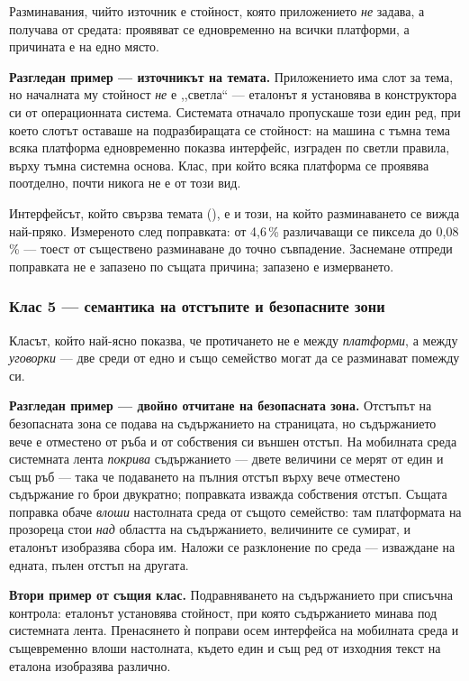 Разминавания, чийто източник е стойност, която приложението \emph{не} задава, а получава от
средата: проявяват се едновременно на всички платформи, а причината е на едно място.

\textbf{Разгледан пример --- източникът на темата.} Приложението има слот за тема, но началната му
стойност \emph{не} е ,,светла“ --- еталонът я установява в конструктора си от операционната система.
Системата отначало пропускаше този един ред, при което слотът оставаше на подразбиращата се
стойност: на машина с тъмна тема всяка платформа едновременно показва интерфейс, изграден по светли
правила, върху тъмна системна основа. Клас, при който всяка платформа се проявява поотделно, почти
никога не е от този вид.

Интерфейсът, който свързва темата (), е и този, на който разминаването се
вижда най-пряко. Измереното след поправката: от 4,6\,\% различаващи се пиксела до 0,08\,\% --- тоест
от съществено разминаване до точно съвпадение. Заснемане отпреди поправката не е запазено по същата
причина; запазено е измерването.

\subsubsection{Клас 5 --- семантика на отстъпите и безопасните зони}

Класът, който най-ясно показва, че протичането не е между \emph{платформи}, а между
\emph{уговорки} --- две среди от едно и също семейство могат да се разминават помежду си.

\textbf{Разгледан пример --- двойно отчитане на безопасната зона.} Отстъпът на безопасната зона се
подава на съдържанието на страницата, но съдържанието вече е отместено от ръба и от собствения си
външен отстъп. На мобилната среда системната лента \emph{покрива} съдържанието --- двете величини
се мерят от един и същ ръб --- така че подаването на пълния отстъп върху вече отместено съдържание
го брои двукратно; поправката изважда собствения отстъп. Същата поправка обаче \emph{влоши}
настолната среда от същото семейство: там платформата на прозореца стои \emph{над} областта на
съдържанието, величините се сумират, и еталонът изобразява сбора им. Наложи се разклонение по
среда --- изваждане на едната, пълен отстъп на другата.

\textbf{Втори пример от същия клас.} Подравняването на съдържанието при списъчна контрола: еталонът
установява стойност, при която съдържанието минава под системната лента. Пренасянето ѝ поправи осем
интерфейса на мобилната среда и същевременно влоши настолната, където един и същ ред от изходния
текст на еталона изобразява различно.

